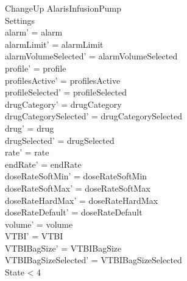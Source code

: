 \begin{schema}{ChangeUp}
	\Delta AlarisInfusionPump\\
	Settings\\
	\where
	alarm' = alarm\\
	alarmLimit' = alarmLimit\\
	alarmVolumeSelected' = alarmVolumeSelected\\
	profile' = profile\\
	profilesActive' = profilesActive\\  
	\pagebreak
	  profileSelected' = profileSelected\\
	drugCategory' = drugCategory\\ drugCategorySelected' = drugCategorySelected\\
	drug' = drug\\ drugSelected' = drugSelected\\
	rate' = rate\\
	endRate' = endRate\\
	doseRateSoftMin' = doseRateSoftMin\\
	doseRateSoftMax' = doseRateSoftMax\\
	doseRateHardMax' = doseRateHardMax\\
	doseRateDefault' = doseRateDefault\\
	volume' = volume\\
	VTBI' = VTBI\\
	VTBIBagSize' = VTBIBagSize\\ 
	VTBIBagSizeSelected' = VTBIBagSizeSelected\\
	State < 4\\

\end{schema}
